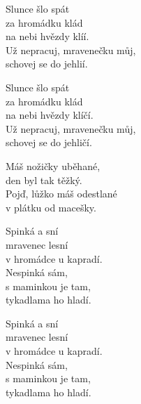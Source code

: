 
\ve{}
Slunce šlo spát \\
za hromádku klád\\
na nebi hvězdy klíí.\\
Už nepracuj, mravenečku můj,\\
schovej se do jehlií.

\ve{}
Slunce šlo spát \\
za hromádku klád\\
na nebi hvězdy klíčí.\\
Už nepracuj, mravenečku můj,\\
schovej se do jehličí.

\cho{}
Máš nožičky uběhané,\\
den byl tak těžký.\\
Pojď, lůžko máš odestlané\\
v plátku od macešky.

\ve{}
Spinká a sní\\
mravenec lesní\\
v hromádce u kapradí.\\
Nespinká sám,\\
s maminkou je tam,\\
tykadlama ho hladí.

\cho{}

\ve{}
Spinká a sní\\
mravenec lesní\\
v hromádce u kapradí.\\
Nespinká sám,\\
s maminkou je tam,\\
tykadlama ho hladí.

\cho{}

\esong{}